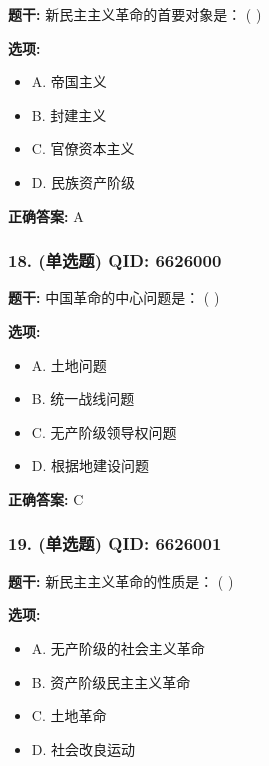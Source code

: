 \documentclass[12pt,UTF8]{ctexart}
\begin{document}
\textbf{题干:}
新民主主义革命的首要对象是： ( )

\textbf{选项:}
\begin{itemize}[leftmargin=*]

  \item A. 帝国主义

  \item B. 封建主义

  \item C. 官僚资本主义

  \item D. 民族资产阶级

\end{itemize}

\textbf{正确答案:}
A

\vspace{0.3em}\hrulefill\vspace{0.7em}

\subsubsection*{18. (单选题) \small QID: 6626000}

\textbf{题干:}
中国革命的中心问题是： ( )

\textbf{选项:}
\begin{itemize}[leftmargin=*]

  \item A. 土地问题

  \item B. 统一战线问题

  \item C. 无产阶级领导权问题

  \item D. 根据地建设问题

\end{itemize}

\textbf{正确答案:}
C

\vspace{0.3em}\hrulefill\vspace{0.7em}

\subsubsection*{19. (单选题) \small QID: 6626001}

\textbf{题干:}
新民主主义革命的性质是： ( )

\textbf{选项:}
\begin{itemize}[leftmargin=*]

  \item A. 无产阶级的社会主义革命

  \item B. 资产阶级民主主义革命

  \item C. 土地革命

  \item D. 社会改良运动

\end{itemize}
\end{document}
